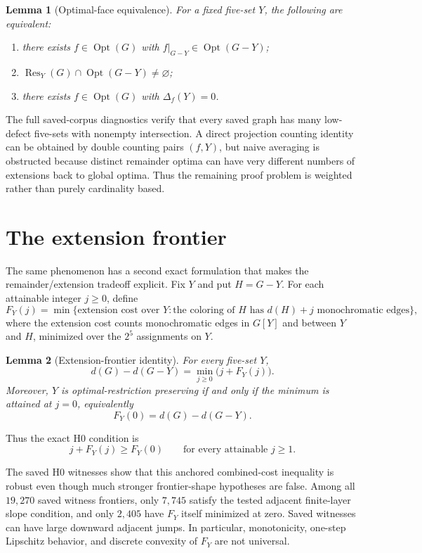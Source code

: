 \documentclass[11pt]{article}
\newtheorem{lemma}{Lemma}
\newcommand{\dd}{d}
\newcommand{\Opt}{\operatorname{Opt}}
\begin{document}
\begin{lemma}[Optimal-face equivalence]
For a fixed five-set $Y$, the following are equivalent:
\begin{enumerate}
\item there exists $f\in\Opt(G)$ with $f|_{G-Y}\in\Opt(G-Y)$;
\item $\operatorname{Res}_Y(G)\cap\Opt(G-Y)\neq\varnothing$;
\item there exists $f\in\Opt(G)$ with $\Delta_f(Y)=0$.
\end{enumerate}
\end{lemma}

The full saved-corpus diagnostics verify that every saved graph has many
low-defect five-sets with nonempty intersection.  A direct projection
counting identity can be obtained by double counting pairs $(f,Y)$, but
naive averaging is obstructed because distinct remainder optima can have
very different numbers of extensions back to global optima.  Thus the
remaining proof problem is weighted rather than purely cardinality based.

\section{The extension frontier}

The same phenomenon has a second exact formulation that makes the
remainder/extension tradeoff explicit.  Fix $Y$ and put $H=G-Y$.
For each attainable integer $j\ge0$, define
\[
F_Y(j)=
\min\{\text{extension cost over }Y:
\text{the coloring of }H\text{ has }\dd(H)+j\text{ monochromatic edges}\},
\]
where the extension cost counts monochromatic edges in $G[Y]$ and between
$Y$ and $H$, minimized over the $2^5$ assignments on $Y$.

\begin{lemma}[Extension-frontier identity]
For every five-set $Y$,
\[
\boxed{
\dd(G)-\dd(G-Y)=\min_{j\ge0}\bigl(j+F_Y(j)\bigr).
}
\]
Moreover, $Y$ is optimal-restriction preserving if and only if the minimum
is attained at $j=0$, equivalently
\[
F_Y(0)=\dd(G)-\dd(G-Y).
\]
\end{lemma}

Thus the exact H0 condition is
\[
j+F_Y(j)\ge F_Y(0)
\qquad\text{for every attainable }j\ge1.
\]

The saved H0 witnesses show that this anchored combined-cost inequality is
robust even though much stronger frontier-shape hypotheses are false.
Among all $19{,}270$ saved witness frontiers, only $7{,}745$ satisfy the
tested adjacent finite-layer slope condition, and only $2{,}405$ have
$F_Y$ itself minimized at zero.  Saved witnesses can have large downward
adjacent jumps.  In particular, monotonicity, one-step Lipschitz behavior,
and discrete convexity of $F_Y$ are not universal.
\end{document}
